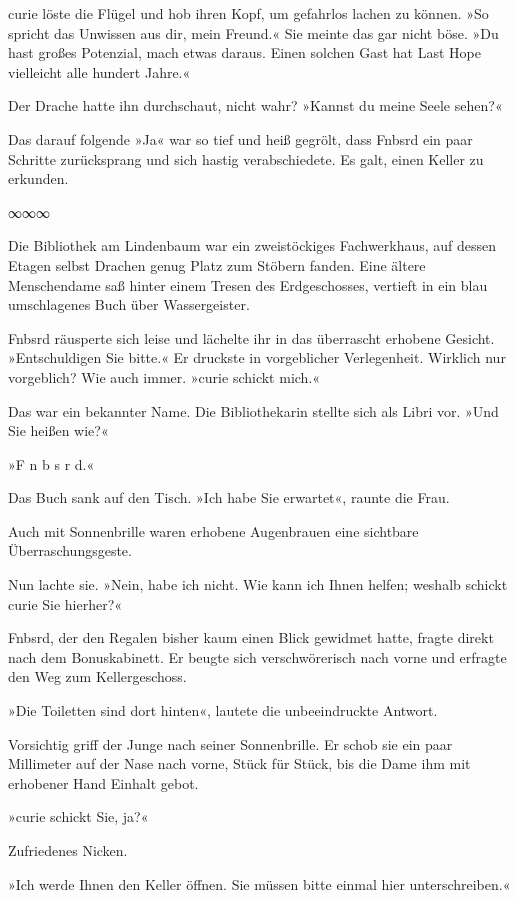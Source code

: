 curie löste die Flügel und hob ihren Kopf, um gefahrlos lachen zu können. »So spricht das Unwissen aus dir, mein Freund.« Sie meinte das gar nicht böse. »Du hast großes Potenzial, mach etwas daraus. Einen solchen Gast hat Last Hope vielleicht alle hundert Jahre.«

Der Drache hatte ihn durchschaut, nicht wahr? »Kannst du meine Seele sehen?«

Das darauf folgende »Ja« war so tief und heiß gegrölt, dass Fnbsrd ein paar Schritte zurücksprang und sich hastig verabschiedete. Es galt, einen Keller zu erkunden.

\begin{center}
∞∞∞
\end{center}

Die Bibliothek am Lindenbaum war ein zweistöckiges Fachwerkhaus, auf dessen Etagen selbst Drachen genug Platz zum Stöbern fanden. Eine ältere Menschendame saß hinter einem Tresen des Erdgeschosses, vertieft in ein blau umschlagenes Buch über Wassergeister.

Fnbsrd räusperte sich leise und lächelte ihr in das überrascht erhobene Gesicht. »Entschuldigen Sie bitte.« Er druckste in vorgeblicher Verlegenheit. Wirklich nur vorgeblich? Wie auch immer. »curie schickt mich.«

Das war ein bekannter Name. Die Bibliothekarin stellte sich als Libri vor. »Und Sie heißen wie?«

»F n b s r d.«

Das Buch sank auf den Tisch. »Ich habe Sie erwartet«, raunte die Frau.

Auch mit Sonnenbrille waren erhobene Augenbrauen eine sichtbare Überraschungsgeste.

Nun lachte sie. »Nein, habe ich nicht. Wie kann ich Ihnen helfen; weshalb schickt curie Sie hierher?«

Fnbsrd, der den Regalen bisher kaum einen Blick gewidmet hatte, fragte direkt nach dem Bonuskabinett. Er beugte sich verschwörerisch nach vorne und erfragte den Weg zum Kellergeschoss.

»Die Toiletten sind dort hinten«, lautete die unbeeindruckte Antwort.

Vorsichtig griff der Junge nach seiner Sonnenbrille. Er schob sie ein paar Millimeter auf der Nase nach vorne, Stück für Stück, bis die Dame ihm mit erhobener Hand Einhalt gebot.

»curie schickt Sie, ja?«

Zufriedenes Nicken.

»Ich werde Ihnen den Keller öffnen. Sie müssen bitte einmal hier unterschreiben.«

